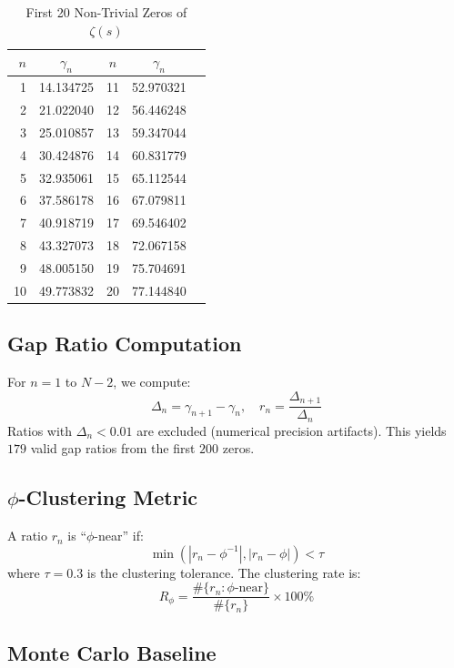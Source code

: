 \documentclass[11pt,a4paper]{article}
\begin{document}
\begin{table}[H]
\centering
\caption{First 20 Non-Trivial Zeros of $\zeta(s)$}
\label{tab:zeros}
\begin{tabular}{@{}rcccc@{}}
\toprule
$n$ & $\gamma_n$ & $n$ & $\gamma_n$ \\
\midrule
1  & 14.134725 & 11 & 52.970321 \\
2  & 21.022040 & 12 & 56.446248 \\
3  & 25.010857 & 13 & 59.347044 \\
4  & 30.424876 & 14 & 60.831779 \\
5  & 32.935061 & 15 & 65.112544 \\
6  & 37.586178 & 16 & 67.079811 \\
7  & 40.918719 & 17 & 69.546402 \\
8  & 43.327073 & 18 & 72.067158 \\
9  & 48.005150 & 19 & 75.704691 \\
10 & 49.773832 & 20 & 77.144840 \\
\bottomrule
\end{tabular}
\end{table}

\subsection{Gap Ratio Computation}

For $n = 1$ to $N-2$, we compute:
\begin{equation}
\Delta_n = \gamma_{n+1} - \gamma_n, \quad r_n = \frac{\Delta_{n+1}}{\Delta_n}
\end{equation}
Ratios with $\Delta_n < 0.01$ are excluded (numerical precision artifacts). This yields $179$ valid gap ratios from the first $200$ zeros.

\subsection{$\phi$-Clustering Metric}

A ratio $r_n$ is ``$\phi$-near'' if:
\begin{equation}
\min\left(|r_n - \phi^{-1}|, |r_n - \phi|\right) < \tau
\end{equation}
where $\tau = 0.3$ is the clustering tolerance. The clustering rate is:
\begin{equation}
R_{\phi} = \frac{\#\{r_n : \text{$\phi$-near}\}}{\#\{r_n\}} \times 100\%
\end{equation}

\subsection{Monte Carlo Baseline}
\end{document}
